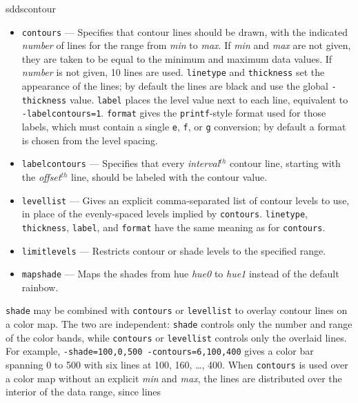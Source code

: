 \begin{sddsprog}{sddscontour}
\begin{itemize}
\begin{itemize}
        indicated {\em number} of shades mapped onto the range from {\em min} to {\em max}.  If {\em min}
        and {\em max} are not given, they are taken to be equal to the minimum and maximum data values.
        If {\em number} is not given, 100 shades are used.
        \item \verb|contours| --- Specifies that contour lines should be drawn, with the
        indicated {\em number} of lines for the range from {\em min} to {\em max}.  If {\em min}
        and {\em max} are not given, they are taken to be equal to the minimum and maximum data values.
        If {\em number} is not given, 10 lines are used.  \verb|linetype| and \verb|thickness| set the
        appearance of the lines; by default the lines are black and use the global \verb|-thickness| value.
        \verb|label| places the level value next to each line, equivalent to \verb|-labelcontours=1|.
        \verb|format| gives the {\tt printf}-style format used for those labels, which must contain a single
        \verb|e|, \verb|f|, or \verb|g| conversion; by default a format is chosen from the level spacing.
        \item \verb|labelcontours| --- Specifies that every {\em interval}$^{th}$ contour line, starting with
        the {\em offset}$^{th}$ line, should be labeled with the contour value.
        \item \verb|levellist| --- Gives an explicit comma-separated list of contour levels to use, in place
        of the evenly-spaced levels implied by \verb|contours|.  \verb|linetype|, \verb|thickness|,
        \verb|label|, and \verb|format| have the same meaning as for \verb|contours|.
        \item \verb|limitlevels| --- Restricts contour or shade levels to the specified range.
        \item \verb|mapshade| --- Maps the shades from hue {\em hue0} to {\em hue1} instead of the default rainbow.
        \end{itemize}
        \verb|shade| may be combined with \verb|contours| or \verb|levellist| to overlay contour lines on a
        color map.  The two are independent: \verb|shade| controls only the number and range of the color
        bands, while \verb|contours| or \verb|levellist| controls only the overlaid lines.  For example,
        \verb|-shade=100,0,500 -contours=6,100,400| gives a color bar spanning 0 to 500 with six lines at
        100, 160, \ldots, 400.  When \verb|contours| is used over a color map without an explicit
        {\em min} and {\em max}, the lines are distributed over the interior of the data range, since lines

\end{itemize}
\end{sddsprog}
